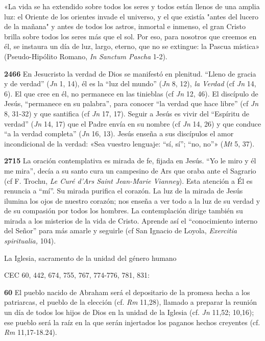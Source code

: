 \documentclass[]{article}
\begin{document}
«La vida se ha extendido sobre todos los seres y todos están llenos de
una amplia luz: el Oriente de los orientes invade el universo, y el que
existía "antes del lucero de la mañana" y antes de todos los astros,
inmortal e inmenso, el gran Cristo brilla sobre todos los seres más que
el sol. Por eso, para nosotros que creemos en él, se instaura un día de
luz, largo, eterno, que no se extingue: la Pascua mística»
(Pseudo-Hipólito Romano, \emph{In Sanctum Pascha} 1-2).

\textbf{2466} En Jesucristo la verdad de Dios se manifestó en plenitud.
``Lleno de gracia y de verdad'' (\emph{Jn} 1, 14), él es la ``luz del
mundo'' (\emph{Jn} 8, 12), \emph{la Verdad} (cf \emph{Jn} 14, 6). El que
cree en él, no permanece en las tinieblas (cf \emph{Jn} 12, 46). El
discípulo de Jesús, ``permanece en su palabra'', para conocer ``la
verdad que hace libre'' (cf \emph{Jn} 8, 31-32) y que santifica (cf
\emph{Jn} 17, 17). Seguir a Jesús es vivir del ``Espíritu de verdad''
(\emph{Jn} 14, 17) que el Padre envía en su nombre (cf \emph{Jn} 14, 26)
y que conduce ``a la verdad completa'' (\emph{Jn} 16, 13). Jesús enseña
a sus discípulos el amor incondicional de la verdad: «Sea vuestro
lenguaje: ``sí, sí''; ``no, no''» (\emph{Mt} 5, 37).

\textbf{2715} La oración contemplativa es mirada de fe, fijada en Jesús.
``Yo le miro y él me mira'', decía a su santo cura un campesino de Ars
que oraba ante el Sagrario (cf F. Trochu, \emph{Le Curé d'Ars Saint
Jean-Marie Vianney}). Esta atención a Él es renuncia a ``mí''. Su mirada
purifica el corazón. La luz de la mirada de Jesús ilumina los ojos de
nuestro corazón; nos enseña a ver todo a la luz de su verdad y de su
compasión por todos los hombres. La contemplación dirige también su
mirada a los misterios de la vida de Cristo. Aprende así el
``conocimiento interno del Señor'' para más amarle y seguirle (cf San
Ignacio de Loyola, \emph{Exercitia spiritualia,} 104).

La Iglesia, sacramento de la unidad del género humano

CEC 60, 442, 674, 755, 767, 774-776, 781, 831:

\textbf{60} El pueblo nacido de Abraham será el depositario de la
promesa hecha a los patriarcas, el pueblo de la elección (cf. \emph{Rm}
11,28), llamado a preparar la reunión un día de todos los hijos de Dios
en la unidad de la Iglesia (cf. \emph{Jn} 11,52; 10,16); ese pueblo será
la raíz en la que serán injertados los paganos hechos creyentes (cf.
\emph{Rm} 11,17-18.24).
\end{document}
